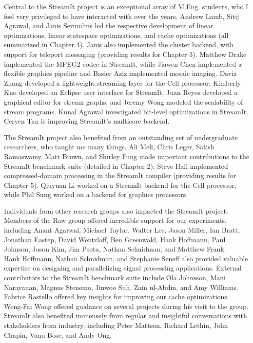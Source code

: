 Central to the StreamIt project is an exceptional array of
M.Eng. students, who I feel very privileged to have interacted with
over the years.  Andrew Lamb, Sitij Agrawal, and Janis Sermulins led
the respective development of linear optimizations, linear statespace
optimizations, and cache optimizations (all summarized in Chapter 4).
Janis also implemented the cluster backend, with support for teleport
messaging (providing results for Chapter 3).  Matthew Drake
implemented the MPEG2 codec in StreamIt, while Jiawen Chen implemented
a flexible graphics pipeline and Basier Aziz implemented mosaic
imaging.  Daviz Zhang developed a lightweight streaming layer for the
Cell processor; Kimberly Kuo developed an Eclipse user interface for
StreamIt; Juan Reyes developed a graphical editor for stream graphs;
and Jeremy Wong modeled the scalability of stream programs.  Kunal
Agrawal investigated bit-level optimizations in StreamIt.  Ceryen Tan
is improving StreamIt's multicore backend.

The StreamIt project also benefited from an outstanding set of
undergraduate researchers, who taught me many things.  Ali Meli, Chris
Leger, Satish Ramaswamy, Matt Brown, and Shirley Fung made important
contributions to the StreamIt benchmark suite (detailed in Chapter 2).
Steve Hall implemented compressed-domain processing in the StreamIt
compiler (providing results for Chapter 5).  Qiuyuan Li worked on a
StreamIt backend for the Cell processor, while Phil Sung worked on a
backend for graphics processors.

Individuals from other research groups also impacted the StreamIt
project.  Members of the Raw group offered incredible support for our
experiments, including Anant Agarwal, Michael Taylor, Walter Lee,
Jason Miller, Ian Bratt, Jonathan Eastep, David Wentzlaff, Ben
Greenwald, Hank Hoffmann, Paul Johnson, Jason Kim, Jim Psota, Nathan
Schnidman, and Matthew Frank.
%
\newpage
\enlargethispage{0.3\baselineskip}
%
~ \vspace{-1.3\baselineskip}\\
\noindent Hank Hoffmann, Nathan Schnidman, and Stephanie Seneff also
provided valuable expertise on designing and parallelizing signal
processing applications.  External contributors to the StreamIt
benchmark suite include Ola Johnsson, Mani Narayanan, Magnus
Stenemo, Jinwoo Suh, Zain ul-Abdin, and Amy Williams.  Fabrice
Rastello offered key insights for improving our cache optimizations.
Weng-Fai Wong offered guidance on several projects during his visit
to the group.  StreamIt also benefited immensely from regular and
insightful conversations with stakeholders from industry, including
Peter Mattson, Richard Lethin, John Chapin, Vanu Bose, and Andy Ong.

